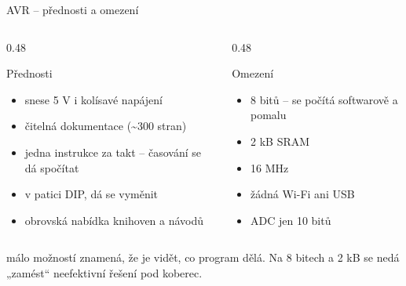 \documentclass[12pt,aspectratio=169]{beamer}
\begin{document}
\begin{frame}{AVR -- přednosti a omezení}
  \begin{columns}[T]
    \begin{column}{0.48\textwidth}
      \begin{exampleblock}{Přednosti}
        \footnotesize
        \begin{itemize}
          \item snese 5 V i kolísavé napájení
          \item čitelná dokumentace (\textasciitilde 300 stran)
          \item jedna instrukce za takt -- časování se dá spočítat
          \item v patici DIP, dá se vyměnit
          \item obrovská nabídka knihoven a návodů
        \end{itemize}
      \end{exampleblock}
    \end{column}
    \begin{column}{0.48\textwidth}
      \begin{alertblock}{Omezení}
        \footnotesize
        \begin{itemize}
          \item 8 bitů --  se počítá softwarově a pomalu
          \item 2 kB SRAM
          \item 16 MHz
          \item žádná Wi-Fi ani USB
          \item ADC jen 10 bitů
        \end{itemize}
      \end{alertblock}
    \end{column}
  \end{columns}
  \vspace{1mm}
  \small
   málo možností znamená, že je vidět, co program dělá.
  Na 8 bitech a 2 kB se nedá „zamést`` neefektivní řešení pod koberec.
\end{frame}
\end{document}
